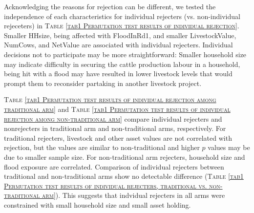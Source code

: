 	Acknowledging the reasons for rejection can be different, we tested the independence of each characteristics for individual rejecters (vs. non-individual rejeceters) in \textsc{\normalsize Table \ref{tab1 Permutation test results of individual rejection}}. Smaller \textsf{HHsize}, being affected with \textsf{FloodInRd1}, and smaller \textsf{LivestockValue}, \textsf{NumCows}, and \textsf{NetValue} are associated with individual rejecters. Individual decisions not to participate may be more straightforward: Smaller household size may indicate difficulty in securing the cattle production labour in a household, being hit with a flood may have resulted in lower livestock levels that would prompt them to reconsider partaking in another livestock project. 

	\textsc{\normalsize Table \ref{tab1 Permutation test results of individual rejection among traditional arm}} and \textsc{\normalsize Table \ref{tab1 Permutation test results of individual rejection among non-traditional arm}} compare individual rejecters and nonrejecters in \textsf{traditional} arm and non-\textsf{traditional} arms, respectively. For \textsf{traditional} rejecters, livestock and other asset values are not correlated with rejection, but the values are similar to non-\textsf{traditional} and higher $p$ values may be due to smaller sample size. For non-\textsf{traditional} arm rejecters, household size and flood exposure are correlated. Comparison of individual rejecters between \textsf{traditional} and non-\textsf{traditional} arms show no detectable difference (\textsc{\normalsize Table \ref{tab1 Permutation test results of individual rejecters, traditional vs. non-traditional arm}}). This suggests that indvidual rejecters in all arms were constrained with small household size and small asset holding.


